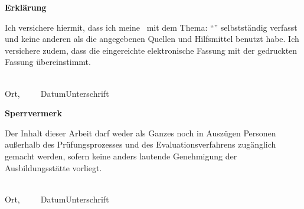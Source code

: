 

\thispagestyle{empty}
\begin{framed}
	\begin{center}
		\Large\bfseries Erklärung
	\end{center}

	\medskip
	\noindent
	Ich versichere hiermit, dass ich meine \Was\ mit
	dem Thema: \enquote{\Titel} selbstständig verfasst und keine anderen als die angegebenen Quellen und
	Hilfsmittel benutzt habe. Ich versichere zudem, dass die eingereichte elektronische Fassung mit der
	gedruckten Fassung übereinstimmt.
	
	\vspace{3cm}
	\noindent
	\underline{\hspace{4cm}}\hfill\underline{\hspace{6cm}}\\
	Ort,~~~~~Datum\hfill Unterschrift\hspace{3.8cm}
\end{framed}

\vfill
\begin{framed}
	\begin{center}
		\Large\bfseries Sperrvermerk
	\end{center}

	\medskip
	\noindent
	Der Inhalt dieser Arbeit darf weder als Ganzes noch in Auszügen Personen
	außerhalb des Prüfungsprozesses und des Evaluationsverfahrens zugänglich gemacht
	werden, sofern keine anders lautende Genehmigung der Ausbildungsstätte vorliegt.
	
	\vspace{3cm}
	\noindent
	\underline{\hspace{4cm}}\hfill\underline{\hspace{6cm}}\\
	Ort,~~~~~Datum\hfill Unterschrift\hspace{3.8cm}
\end{framed}

\endinput
